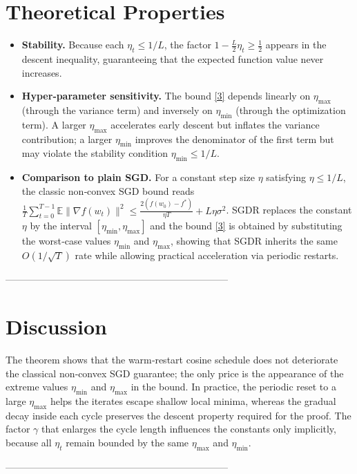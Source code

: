 \documentclass{article}
\newcommand{\EE}{\mathbb{E}}
\begin{document}
\section*{Theoretical Properties}
\begin{itemize}
\item \textbf{Stability.} Because each $\eta_{t}\le 1/L$, the factor
$1-\tfrac{L}{2}\eta_{t}\ge \tfrac12$ appears in the descent inequality,
guaranteeing that the expected function value never increases.
\item \textbf{Hyper‑parameter sensitivity.}
  The bound \eqref{3} depends linearly on $\eta_{\max}$ (through the variance
  term) and inversely on $\eta_{\min}$ (through the optimization term).  A
  larger $\eta_{\max}$ accelerates early descent but inflates the variance
  contribution; a larger $\eta_{\min}$ improves the denominator of the first
  term but may violate the stability condition $ \eta_{\min}\le 1/L $.
\item \textbf{Comparison to plain SGD.}
  For a constant step size $\eta$ satisfying $\eta\le 1/L$, the classic
  non‑convex SGD bound reads
  $\frac{1}{T}\sum_{t=0}^{T-1}\EE\|\nabla f(w_t)\|^{2}
   \le \frac{2(f(w_{0})-f^{*})}{\eta T}+L\eta\sigma^{2}$.
  SGDR replaces the constant $\eta$ by the interval
  $[\eta_{\min},\eta_{\max}]$ and the bound \eqref{3} is obtained by
  substituting the worst‑case values $\eta_{\min}$ and $\eta_{\max}$,
  showing that SGDR inherits the same $O(1/\sqrt{T})$ rate while allowing
  practical acceleration via periodic restarts.
\end{itemize}

---------------------------------------------------------------------

\section*{Discussion}
The theorem shows that the warm‑restart cosine schedule does not deteriorate
the classical non‑convex SGD guarantee; the only price is the appearance of
the extreme values $\eta_{\min}$ and $\eta_{\max}$ in the bound.  In practice,
the periodic reset to a large $\eta_{\max}$ helps the iterates escape shallow
local minima, whereas the gradual decay inside each cycle preserves the
descent property required for the proof.  The factor $\gamma$ that enlarges the
cycle length influences the constants only implicitly, because all
$\eta_{t}$ remain bounded by the same $\eta_{\max}$ and $\eta_{\min}$.

---------------------------------------------------------------------
\end{document}
